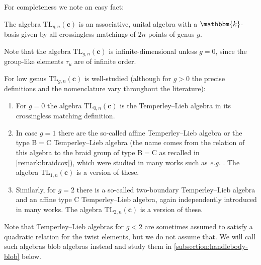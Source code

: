 \documentclass[a4paper,11pt]{amsart}
\newcommand{\eg}{\textsl{e.g.}}
\newcommand{\setstuff}[1]{\mathrm{#1}}
\newcommand{\KK}{\mathbbm{k}}
\newcommand{\bsym}[1]{\boldsymbol{#1}}
\newcommand{\cpar}{\bsym{c}}
\numberwithin{equation}{section}
\let\fullref\autoref
\begin{document}
For completeness we note an easy fact:

\begin{lemmaqed}\label{lemma:tl-basis}
The algebra $\setstuff{TL}_{g,n}(\cpar)$ is an associative, unital 
algebra with a $\KK$-basis given by all crossingless 
matchings of $2n$ points of genus $g$.
\end{lemmaqed}

Note that the algebra $\setstuff{TL}_{g,n}(\cpar)$ is 
infinite-dimensional unless $g=0$, since the group-like elements $\tau_{u}$ 
are of infinite order.

\begin{remark}\label{remark:tl}
For low genus $\setstuff{TL}_{g,n}(\cpar)$ is well-studied 
(although for $g>0$ the precise definitions and the 
nomenclature vary 
throughout the literature):
\begin{enumerate}

\setlength\itemsep{0.15cm}

\item For $g=0$ the algebra 
$\setstuff{TL}_{0,n}(\cpar)$ is the 
Temperley--Lieb algebra in its crossingless matching definition.

\item In case $g=1$ there are the so-called 
affine Temperley--Lieb algebra or the
type B$=$C Temperley--Lieb algebra 
(the name comes from the relation of this algebra 
to the braid group of type B$=$C 
as recalled in \fullref{remark:braidcox}), 
which were studied in many works such as {\eg} \cite{GrLe-affine-tl}.
The algebra $\setstuff{TL}_{1,n}(\cpar)$ is a version of these.

\item Similarly, for 
$g=2$ there is a so-called two-boundary 
Temperley--Lieb algebra 
and an affine type C Temperley--Lieb 
algebra, again independently 
introduced in many works.
The algebra $\setstuff{TL}_{2,n}(\cpar)$ 
is a version of these.

\end{enumerate}
Note that Temperley--Lieb algebras for $g<2$
are sometimes assumed to satisfy a quadratic relation for the twist 
elements, but we do not assume that.
We will call such algebras blob algebras instead 
and study them in \fullref{subsection:handlebody-blob} below.
\end{remark}
\end{document}

